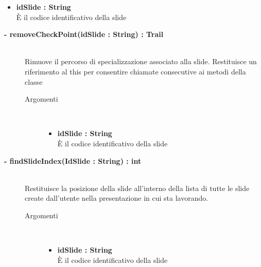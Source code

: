 \begin{description}
\begin{description}
\begin{description}
\begin{itemize}
					\item \textbf{idSlide : String		} \hfill \\
					È il codice identificativo della slide 
					
				\end{itemize}
			
		\end{description}
	\end{description}
	
	\begin{description}
		\item[\textbf{\color{blue}- removeCheckPoint(idSlide : String) : Trail			}] \hfill \\
			Rimuove il percorso di specializzazione associato alla slide. Restituisce un riferimento al this per consentire chiamate consecutive ai metodi della classe
			
		\begin{description}
			\item[Argomenti] \hfill \\
				\begin{itemize}
				
					\item \textbf{idSlide : String		} \hfill \\
					È il codice identificativo della slide 
					
				\end{itemize}
			
		\end{description}
	\end{description}
	
	\begin{description}
		\item[\textbf{\color{blue}- findSlideIndex(IdSlide : String) : int			}] \hfill \\
			Restituisce la posizione della slide all'interno della lista di tutte le slide create dall'utente nella presentazione in cui sta lavorando.
			
		\begin{description}
			\item[Argomenti] \hfill \\
				\begin{itemize}
				
					\item \textbf{idSlide : String		} \hfill \\
					È il codice identificativo della slide 
					

\end{itemize}
\end{description}
\end{description}
\end{description}
